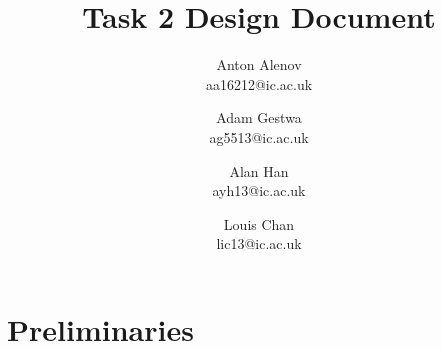 \documentclass[11pt]{article}
\begin{document}
\title{Task 2 Design Document}
\author{Anton Alenov\\aa16212@ic.ac.uk \and Adam Gestwa\\ag5513@ic.ac.uk \and Alan Han\\ayh13@ic.ac.uk \and Louis Chan\\lic13@ic.ac.uk}

\maketitle

\section{Preliminaries}


\newpage

\end{document}
